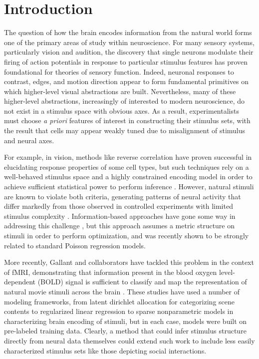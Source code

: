 \documentclass[10pt,letterpaper]{article}
\begin{document}
\linenumbers

\section*{Introduction}
The question of how the brain encodes information from the natural world forms one of the primary areas of study within neuroscience. For many sensory systems, particularly vision and audition, the discovery that single neurons modulate their firing of action potentials in response to particular stimulus features has proven foundational for theories of sensory function. Indeed, neuronal responses to contrast, edges, and motion direction appear to form fundamental primitives on which higher-level visual abstractions are built. Nevertheless, many of these higher-level abstractions, increasingly of interested to modern neuroscience, do not exist in a stimulus space with obvious axes. As a result, experimentalists must choose \emph{a priori} features of interest in constructing their stimulus sets, with the result that cells may appear weakly tuned due to misalignment of stimulus and neural axes.

For example, in vision, methods like reverse correlation have proven successful in elucidating response properties of some cell types, but such techniques rely on a well-behaved stimulus space and a highly constrained encoding model in order to achieve sufficient statistical power to perform inference \cite{steveninck1988realtime,ringach2004reverse,ringach2002receptive}. However, natural stimuli are known to violate both criteria, generating patterns of neural activity that differ markedly from those observed in controlled experiments with limited stimulus complexity \cite{ringach2002receptive,sharpee2004analyzing,Vinje2000-dx}. Information-based approaches have gone some way in addressing this challenge \cite{sharpee2004analyzing}, but this approach assumes a metric structure on stimuli in order to perform optimization, and was recently shown to be strongly related to standard Poisson regression models\cite{Williamson2013-rg}.

More recently, Gallant and collaborators have tackled this problem in the context of fMRI, demonstrating that information present in the blood oxygen level-dependent (BOLD) signal is sufficient to classify and map the representation of natural movie stimuli across the brain \cite{Vu2011-da,Huth2012-cj,Stansbury2013-nm}. These studies have used a number of modeling frameworks, from latent dirichlet allocation for categorizing scene contents \cite{Stansbury2013-nm} to regularized linear regression \cite{Huth2012-cj} to sparse nonparametric models \cite{Vu2011-da} in characterizing brain encoding of stimuli, but in each case, models were built on pre-labeled training data. Clearly, a method that could infer stimulus structure directly from neural data themselves could extend such work to include less easily characterized stimulus sets like those depicting social interactions.
\end{document}
